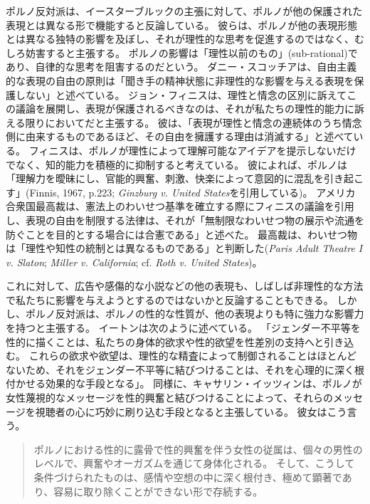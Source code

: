 \documentclass[paper=a4,book,openany]{jlreq}
\begin{document}
ポルノ反対派は、イースターブルックの主張に対して、ポルノが他の保護された表現とは異なる形で機能すると反論している。
彼らは、ポルノが他の表現形態とは異なる独特の影響を及ぼし、それが理性的な思考を促進するのではなく、むしろ妨害すると主張する。
ポルノの影響は「理性以前のもの」(sub-rational)であり、自律的な思考を阻害するのだという。
ダニー・スコッチアは、自由主義的な表現の自由の原則は「聞き手の精神状態に非理性的な影響を与える表現を保護しない」と述べている\citep[p.777]{scoccia96:_can_liber_suppor_ban_violen_pornog}。
ジョン・フィニスは、理性と情念の区別に訴えてこの議論を展開し、表現が保護されるべきなのは、それが私たちの理性的能力に訴える限りにおいてだと主張する。
彼は、「表現が理性と情念の連続体のうち情念側に由来するものであるほど、その自由を擁護する理由は消滅する」と述べている\citep[p.222]{finnis67:_reason_passion}。
フィニスは、ポルノが理性によって理解可能なアイデアを提示しないだけでなく、知的能力を積極的に抑制すると考えている。
彼によれば、ポルノは「理解力を曖昧にし、官能的興奮、刺激、快楽によって意図的に混乱を引き起こす」(Finnis, 1967, p.223; \emph{Ginzburg v. United States}を引用している)。
\nocite{finnis67:_reason_passion}
アメリカ合衆国最高裁は、憲法上のわいせつ基準を確立する際にフィニスの議論を引用し、表現の自由を制限する法律は、それが「無制限なわいせつ物の展示や流通を防ぐことを目的とする場合には合憲である」と述べた。
最高裁は、わいせつ物は「理性や知性の統制とは異なるものである」と判断した(\emph{Paris Adult Theatre I v. Slaton}; \emph{Miller v. California}; cf. \emph{Roth v. United States})。

これに対して、広告や感傷的な小説などの他の表現も、しばしば非理性的な方法で私たちに影響を与えようとするのではないかと反論することもできる。
しかし、ポルノ反対派は、ポルノの性的な性質が、他の表現よりも特に強力な影響力を持つと主張する。
イートンは次のように述べている。
「ジェンダー不平等を性的に描くことは、私たちの身体的欲求や性的欲望を性差別の支持へと引き込む。
これらの欲求や欲望は、理性的な精査によって制御されることはほとんどないため、それをジェンダー不平等に結びつけることは、それを心理的に深く根付かせる効果的な手段となる」\citep[p.679]{eaton07:sensibleantiporn}。
同様に、キャサリン・イッツィンは、ポルノが女性蔑視的なメッセージを性的興奮と結びつけることによって、それらのメッセージを視聴者の心に巧妙に刷り込む手段となると主張している。
彼女はこう言う。

\begin{quote}
  ポルノにおける性的に露骨で性的興奮を伴う女性の従属は、個々の男性のレベルで、興奮やオーガズムを通じて身体化される。
そして、こうして条件づけられたものは、感情や空想の中に深く根付き、極めて顕著であり、容易に取り除くことができない形で存続する。
\citep[p.23]{itzin02:_pornog_const_misog}
\end{quote}
\end{document}
